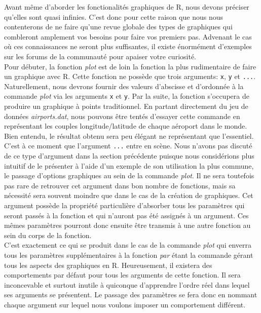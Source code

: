 Avant même d'aborder les fonctionalités graphiques de R, nous devons préciser qu'elles sont quasi infinies. C'est donc pour cette raison que nous nous contenterons de ne faire qu'une revue globale des types de graphiques qui combleront amplement vos besoins pour faire vos premiers pas. Advenant le cas où ces connaissances ne seront plus suffisantes, il existe énormément d'exemples sur les forums de la communauté pour apaiser votre curiosité. \\

Pour débuter, la fonction \emph{plot} \cite{Rfunction:plot} est de loin la fonction la plus rudimentaire de faire un graphique avec R. Cette fonction ne possède que trois arguments: \texttt{x}, \texttt{y} et \texttt{...}. Naturellement, nous devrons fournir des valeurs d'abscisse et d'ordonnée à la commande \emph{plot} via les arguments \texttt{x} et \texttt{y}. Par la suite, la fonction s'occupera de produire un graphique à points traditionnel. En partant directement du jeu de données \emph{airports.dat}, nous pouvons être tentés d'essayer cette commande en représentant les couples longitude/latitude de chaque aéroport dans le monde. Bien entendu, le résultat obtenu sera peu élégant ne représentant que l'essentiel. \\

C'est à ce moment que l'argument \texttt{...} entre en scène. Nous n'avons pas discuté de ce type d'argument dans la section précédente puisque nous considérions plus intuitif de le présenter à l'aide d'un exemple de son utilisation la plus commune, le passage d'options graphiques au sein de la commande \emph{plot}. Il ne sera toutefois pas rare de retrouver cet argument dans bon nombre de fonctions, mais sa nécessité sera souvent moindre que dans le cas de la création de graphiques. Cet argument possède la propriété particulière d'absorber tous les paramètres qui seront passés à la fonction et qui n'auront pas été assignés à un argument. Ces mêmes paramètres pourront donc ensuite être transmis à une autre fonction au sein du corps de la fonction. \\

C'est exactement ce qui se produit dans le cas de la commande \emph{plot} qui enverra tous les paramètres supplémentaires à la fonction \emph{par} \cite{Rfunction:par} étant la commande gérant tous les aspects des graphiques en R. Heureusement, il existera des comportements par défaut pour tous les arguments de cette fonction. Il sera inconcevable et surtout inutile à quiconque d'apprendre l'ordre réel dans lequel ses arguments se présentent. Le passage des paramètres se fera donc en nommant chaque argument sur lequel nous voulons imposer un comportement différent. \\

